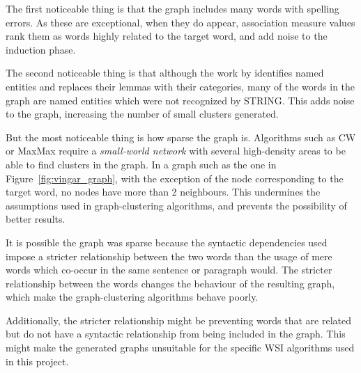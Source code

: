 The first noticeable thing is that the graph includes many words with spelling
errors. As these are exceptional, when they do appear, association measure
values rank them as words highly related to the target word, and add noise to
the induction phase.

The second noticeable thing is that although the work by
\citet{correia2015syntax} identifies named entities and replaces their lemmas
with their categories, many of the words in the graph are named entities which
were not recognized by \ac{STRING}. This adds noise to the graph, increasing the
number of small clusters generated.

But the most noticeable thing is how sparse the graph is. Algorithms such as
\ac{CW} or MaxMax require a \emph{small-world network} with several high-density
areas to be able to find clusters in the graph. In a graph such as the one
in Figure~\ref{fig:vingar_graph}, with the exception of the node corresponding
to the target word, no nodes have more than 2 neighbours. This undermines the
assumptions used in graph-clustering algorithms, and prevents the possibility
of better results.

It is possible the graph was sparse because the syntactic dependencies used
impose a stricter relationship between the two words than the usage of mere
words which co-occur in the same sentence or paragraph would. The stricter
relationship between the words changes the behaviour of the resulting graph,
which make the graph-clustering algorithms behave poorly.

Additionally, the stricter relationship might be preventing words that are
related but do not have a syntactic relationship from being included in the
graph. This might make the generated graphs unsuitable for the specific \ac{WSI}
algorithms used in this project.

